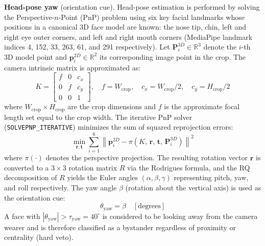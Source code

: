 \textbf{Head-pose yaw} (orientation cue). Head-pose estimation is performed by solving
the Perspective-$n$-Point (PnP) problem \cite{pnp1995} using six key facial landmarks
whose positions in a canonical 3D face model are known: the nose tip, chin, left and
right eye outer corners, and left and right mouth corners (MediaPipe landmark indices
4, 152, 33, 263, 61, and 291 respectively). Let
$\mathbf{P}_i^{3D} \in \mathbb{R}^3$ denote the $i$-th 3D model point and
$\mathbf{p}_i^{2D} \in \mathbb{R}^2$ its corresponding image point in the crop.
The camera intrinsic matrix is approximated as:
\begin{equation}
  K = \begin{bmatrix} f & 0 & c_x \\ 0 & f & c_y \\ 0 & 0 & 1 \end{bmatrix},
  \quad f = W_{\mathrm{crop}}, \quad c_x = W_{\mathrm{crop}}/2, \quad c_y = H_{\mathrm{crop}}/2
  \label{eq:camera_matrix}
\end{equation}
where $W_{\mathrm{crop}} \times H_{\mathrm{crop}}$ are the crop dimensions and $f$ is
the approximate focal length set equal to the crop width. The iterative PnP solver
(\texttt{SOLVEPNP\_ITERATIVE}) minimizes the sum of squared reprojection errors:
\begin{equation}
  \min_{\mathbf{r}, \mathbf{t}} \sum_{i=1}^{6}
  \left\| \mathbf{p}_i^{2D} - \pi\!\left(K,\, \mathbf{r},\, \mathbf{t},\, \mathbf{P}_i^{3D}\right) \right\|^2
  \label{eq:pnp}
\end{equation}
where $\pi(\cdot)$ denotes the perspective projection. The resulting rotation vector
$\mathbf{r}$ is converted to a $3\times3$ rotation matrix $R$ via the Rodrigues formula,
and the RQ decomposition of $R$ yields the Euler angles $(\alpha, \beta, \gamma)$
representing pitch, yaw, and roll respectively. The yaw angle $\beta$ (rotation about
the vertical axis) is used as the orientation cue:
\begin{equation}
  \theta_{\mathrm{yaw}} = \beta \quad [\text{degrees}]
  \label{eq:yaw}
\end{equation}
A face with $|\theta_{\mathrm{yaw}}| > \tau_{\mathrm{yaw}} = 40^\circ$ is considered to
be looking away from the camera wearer and is therefore classified as a bystander
regardless of proximity or centrality (hard veto).

